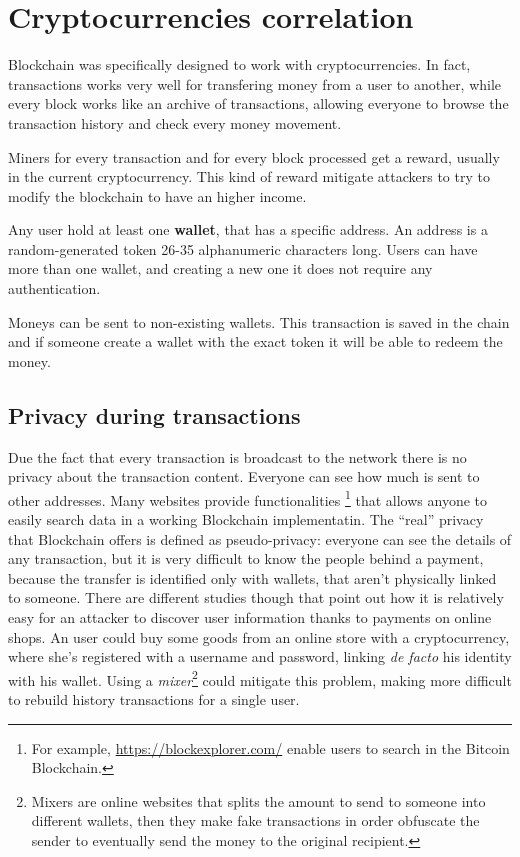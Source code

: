 \section{Cryptocurrencies correlation}
\label{sec:crypto_corr}

Blockchain was specifically designed to work with cryptocurrencies. In fact,
transactions works very well for transfering money from a user to another, while
every block works like an archive of transactions, allowing everyone to browse
the transaction history and check every money movement.

Miners for every transaction and for every block processed get a reward,
usually in the current cryptocurrency. This kind of reward mitigate attackers to
try to modify the blockchain to have an higher income.

Any user hold at least one \textbf{wallet}, that has a specific address. An
address is a random-generated token 26-35 alphanumeric characters long. Users
can have more than one wallet, and creating a new one it does not require any
authentication.

Moneys can be sent to non-existing wallets. This transaction is saved in the
chain and if someone create a wallet with the exact token it will be able
to redeem the money.

\subsection{Privacy during transactions}

Due the fact that every transaction is broadcast to the network there is no
privacy about the transaction content. Everyone can see how much is sent to
other addresses. Many websites provide functionalities
\footnote{For example, \url{https://blockexplorer.com/} enable users to search
in the Bitcoin Blockchain.} that allows anyone to easily search data in a
working Blockchain implementatin. The ``real'' privacy that Blockchain offers
is defined as pseudo-privacy: everyone can see the details of any transaction,
but it is very difficult to know the people behind a payment, because the
transfer is identified only with wallets, that aren't physically linked to
someone. There are different studies \cite{guadamuz15} though that point out
how it is relatively easy for an attacker to discover user information thanks
to payments on online shops. An user could buy some goods from an online store
with a cryptocurrency, where she's registered with a username and password,
linking \textit{de facto} his identity with his wallet. Using a
\textit{mixer}\footnote{Mixers are online websites that splits the amount to
send to someone into different wallets, then they make fake transactions in
order obfuscate the sender to eventually send the money to the original
recipient.} could mitigate this problem, making more difficult to rebuild
history transactions for a single user.

